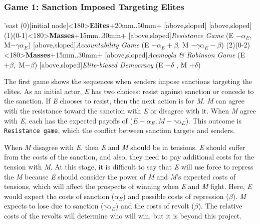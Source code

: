 \documentclass[11pt, letterpage, titlepage]{article}
\begin{document}
\subsubsection*{Game 1: Sanction Imposed Targeting Elites}
\begin{center}
\begin{istgame}[font=\footnotesize]
	\centering
	\setistgrowdirection'{east}
	\xtShowArrows
	\istroot(0)[initial node]<180>{\textbf{Elites}}+20mm..50mm+
	[above,sloped]  [above,sloped] \endist
	\istroot(1)(0-1)<180>{\textbf{Masses}}+15mm..30mm+
	[above,sloped]{\textit{Resistance Game} (E $- \alpha_{E}$, M$-\gamma$$\alpha_{E}$) }
	[above,sloped]{\textit{Accountability Game} (E $- \alpha_{E} + \beta$, M $- \gamma\alpha_{E} - \beta$)}  \endist
	\istroot(2)(0-2)<180>{\textbf{Masses}}+15mm..30mm+
	[above,sloped]{\textit{Acemoglu \& Robinson Game} (E $+ \beta,\; $M$-\beta$)}
	[above,sloped]{\textit{Elite-biased Democracy} (E $-\delta$ , M $+ \delta$)} \endist
\end{istgame}
\end{center}
	
The first game shows the sequences when senders impose sanctions targeting the elites. As an initial actor, \textit{E} has two choices: resist against sanction or concede to the sanction. If \textit{E} chooses to resist, then the next action is for \textit{M}. \textit{M} can agree with the resistance toward the sanction with \textit{E} or disagree with it. When \textit{M} agree with \textit{E}, each has the expected payoffs of ($E-\alpha_E, M-\gamma\alpha_{E}$). This outcome is \texttt{Resistance game}, which the conflict between sanction targets and senders.
	
When \textit{M} disagree with \textit{E}, then \textit{E} and \textit{M} should be in tensions. \textit{E} should suffer from the costs of the sanction, and also, they need to pay additional costs for the tension with \textit{M}. At this stage, it is difficult to say that \textit{E} will use force to repress the \textit{M} because \textit{E} should consider the power of \textit{M} and \textit{M}'s expected costs of tensions, which will affect the prospects of winning when \textit{E} and \textit{M} fight. Here, \textit{E} would expect the costs of sanction ($\alpha_{E}$) and possible costs of repression ($\beta$). \textit{M} expects to lose due to sanction ($\gamma\alpha_{E}$) and the costs of revolt ($\beta$). The relative costs of the revolts will determine who will win, but it is beyond this project.
	
\end{document}

